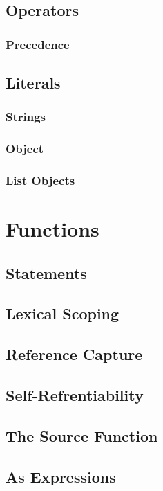 \documentclass[12pt,letterpaper]{report}
\begin{document}
\section{Operators}\label{Operators}
\subsection{Precedence}\label{Precedence}
\section{Literals}\label{Literals}
\subsection{Strings}\label{Strings}
\subsection{Object}\label{Object}
\subsection{List Objects}\label{List Objects}
\chapter{Functions}\label{Functions}
\section{Statements}\label{Statements}
\section{Lexical Scoping}\label{Lexical Scoping}
\section{Reference Capture}\label{Reference Capture}
\section{Self-Refrentiability}\label{Self-Refrentiability}
\section{The Source Function}\label{The Source Function}
\section{As Expressions}\label{As Expressions}
\end{document}
